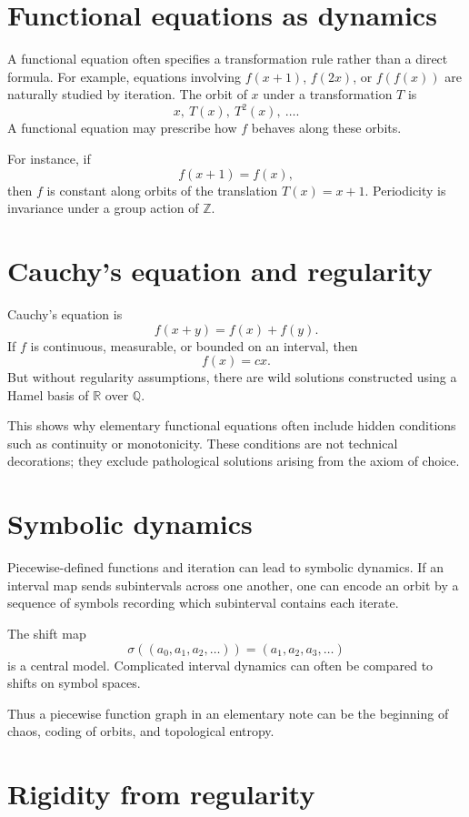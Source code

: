 \section{Functional equations as dynamics}

A functional equation often specifies a transformation rule rather than a direct formula.  For example, equations involving $f(x+1)$, $f(2x)$, or $f(f(x))$ are naturally studied by iteration.  The orbit of $x$ under a transformation $T$ is
\[
  x,\ T(x),\ T^2(x),\ \ldots.
\]
A functional equation may prescribe how $f$ behaves along these orbits.

For instance, if
\[
  f(x+1)=f(x),
\]
then $f$ is constant along orbits of the translation $T(x)=x+1$.  Periodicity is invariance under a group action of $\mathbb Z$.

\section{Cauchy's equation and regularity}

Cauchy's equation is
\[
  f(x+y)=f(x)+f(y).
\]
If $f$ is continuous, measurable, or bounded on an interval, then
\[
  f(x)=cx.
\]
But without regularity assumptions, there are wild solutions constructed using a Hamel basis of $\mathbb R$ over $\mathbb Q$.

This shows why elementary functional equations often include hidden conditions such as continuity or monotonicity.  These conditions are not technical decorations; they exclude pathological solutions arising from the axiom of choice.

\section{Symbolic dynamics}

Piecewise-defined functions and iteration can lead to symbolic dynamics.  If an interval map sends subintervals across one another, one can encode an orbit by a sequence of symbols recording which subinterval contains each iterate.

The shift map
\[
  \sigma((a_0,a_1,a_2,\ldots))=(a_1,a_2,a_3,\ldots)
\]
is a central model.  Complicated interval dynamics can often be compared to shifts on symbol spaces.

Thus a piecewise function graph in an elementary note can be the beginning of chaos, coding of orbits, and topological entropy.

\section{Rigidity from regularity}

